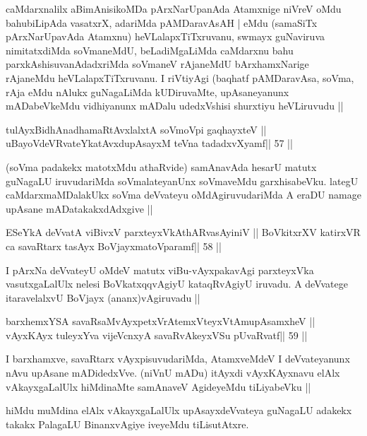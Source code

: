 \begin{artha}
caMdarxnalilx aBimAnisikoMDa pArxNarUpanAda Atamxnige niVreV oMdu bahubiLipAda vasatxrX, adariMda pAMDaravAsAH | eMdu (samaSiTx pArxNarUpavAda Atamxnu) heVLalapxTiTxruvanu, swmayx guNaviruva nimitatxdiMda soVmaneMdU, beLadiMgaLiMda caMdarxnu bahu parxkAshisuvanAdadxriMda soVmaneV rAjaneMdU bArxhamxNarige rAjaneMdu heVLalapxTiTxruvanu. I riVtiyAgi (baqhatf pAMDaravAsa, soVma, rAja eMdu nAlukx guNagaLiMda kUDiruvaMte, upAsaneyanunx mADabeVkeMdu vidhiyanunx mADalu udedxVshisi shurxtiyu heVLiruvudu ||
\end{artha}

\begin{shl}
tulAyxBidhAnadhamaRtAvxlalxtA soVmoV\s pi gaqhayxteV ||
uBayoVdeVRvateYkatAvxdupAsayxM teVna tadadxvXyamf\hfill || 57 ||
\end{shl}

\begin{artha}
(soVma padakekx matotxMdu athaRvide) samAnavAda hesarU matutx guNagaLU 
iruvudariMda soVmalateyanUnx soVmaveMdu garxhisabeVku. lategU 
caMdarxmaMDalakUkx soVma deVvateyu oMdAgiruvudariMda A eraDU namage upAsane mADatakakxdAdxgive ||
\end{artha}

\begin{shl}
ESeYkA deVvatA viBivxV parxteyxVkAthARvasAyiniV ||
BoVkitxrXV katirxVR ca savaRtarx tasAyx BoVjayxmatoV\s paramf\hfill || 58 ||
\end{shl}

\begin{artha}
I pArxNa deVvateyU oMdeV matutx viBu-vAyxpakavAgi parxteyxVka 
vasutxgaLalUlx nelesi BoVkatxqqvAgiyU kataqRvAgiyU iruvadu. A deVvatege itaravelalxvU BoVjayx (ananx)vAgiruvadu ||
\end{artha}

\begin{shl}
barxhemxYSA savaRsaMvAyxpetxVrAtemxVteyxVtAmupAsamxheV ||
vAyxKAyx tuleyxYva vijeVcnxyA savaRvAkeyxVSu pUvaRvatf\hfill || 59 ||
\end{shl}

\begin{artha}
I barxhamxve, savaRtarx vAyxpisuvudariMda, AtamxveMdeV I deVvateyanunx nAvu upAsane mADidedxVve. (niVnU mADu) itAyxdi vAyxKAyxnavu elAlx vAkayxgaLalUlx hiMdinaMte samAnaveV AgideyeMdu tiLiyabeVku ||
\end{artha}

\begin{artha}
hiMdu muMdina elAlx vAkayxgaLalUlx upAsayxdeVvateya guNagaLU adakekx takakx PalagaLU BinanxvAgiye iveyeMdu tiLisutAtxre.
\end{artha}

